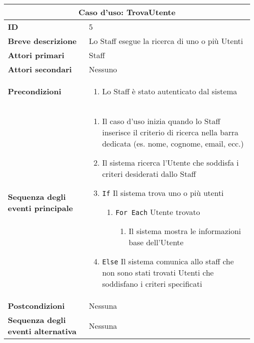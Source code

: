 \documentclass[a4paper]{report}
\begin{document}
\clearpage
\begin{table}[H]
\vspace*{-0cm}
\renewcommand{\arraystretch}{1.9}
\begin{tabular}{|p{3.9cm}|p{9.9cm}|}
\hline
\multicolumn{2}{|c|}{\textbf{Caso d’uso: TrovaUtente}} \\ \hline
\textbf{ID} & 5 \\ \hline
\textbf{Breve descrizione} & Lo Staff esegue la ricerca di uno o più Utenti \\ \hline
\textbf{Attori primari} & Staff \\ \hline
\textbf{Attori secondari} & Nessuno \\ \hline
\textbf{Precondizioni} & \begin{enumerate}[leftmargin=14pt,label=\arabic*.,labelsep=0.5em,topsep=0pt,partopsep=0pt,parsep=0pt,itemsep=0pt]
    \item Lo Staff è stato autenticato dal sistema
\end{enumerate} \\ \hline
\textbf{Sequenza degli eventi principale} &
\begin{enumerate}[leftmargin=14pt,label=\arabic*.,labelsep=0.5em,topsep=0pt,partopsep=0pt,parsep=0pt,itemsep=0pt]
    \item Il caso d’uso inizia quando lo Staff inserisce il criterio di ricerca nella barra dedicata (es. nome, cognome, email, ecc.)
    \item Il sistema ricerca l’Utente che soddisfa i criteri desiderati dallo Staff
    \item \texttt{If} Il sistema trova uno o più utenti
    \begin{enumerate}[label=\arabic{enumi}.\arabic{enumii}.,leftmargin=22pt,labelsep=0.5em,topsep=0pt,partopsep=0pt,parsep=0pt,itemsep=0pt]
    \item \texttt{For Each} Utente trovato
    \begin{enumerate}[label=\arabic{enumi}.\arabic{enumii}.\arabic{enumiii}.,leftmargin=22pt,labelsep=0.5em,topsep=0pt,partopsep=0pt,parsep=0pt,itemsep=0pt]
        \item Il sistema mostra le informazioni base dell’Utente
    \end{enumerate}
    \end{enumerate}
    \item \texttt{Else} Il sistema comunica allo staff che non sono stati trovati Utenti che soddisfano i criteri specificati
\end{enumerate}\\ \hline
\textbf{Postcondizioni} & Nessuna \\ \hline
\textbf{Sequenza degli eventi alternativa} & Nessuna \\ \hline
\end{tabular}
\end{table}
\end{document}
